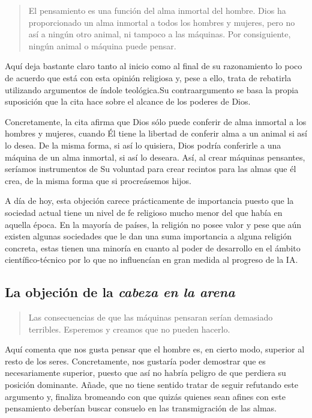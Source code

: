 \documentclass[12pt,a4paper]{article}
\begin{document}
\begin{quote}\small El pensamiento es una función del alma inmortal del hombre. Dios ha proporcionado un alma inmortal a todos los hombres y mujeres, pero no así a ningún otro animal, ni tampoco a las máquinas. Por consiguiente, ningún animal o máquina puede pensar.\end{quote}

Aquí deja bastante claro tanto al inicio como al final de su razonamiento lo poco de acuerdo que está con esta opinión religiosa y, pese a ello, trata de rebatirla utilizando argumentos de índole teológica.Su contraargumento se basa la propia suposición que la cita hace sobre el alcance de los poderes de Dios.

Concretamente, la cita afirma que Dios sólo puede conferir de alma inmortal a los hombres y mujeres, cuando Él tiene la libertad de conferir alma a un animal si así lo desea. De la misma forma, si así lo quisiera, Dios podría conferirle a una máquina de un alma inmortal, si así lo deseara. Así, al crear máquinas pensantes, seríamos instrumentos de Su voluntad para crear recintos para las almas que él crea, de la misma forma que si procreásemos hijos.

A día de hoy, esta objeción carece prácticamente de importancia puesto que la sociedad actual tiene un nivel de fe religioso mucho menor del que había en aquella época. En la mayoría de países, la religión no posee valor y pese que aún existen algunas sociedades que le dan una suma importancia a alguna religión concreta, estas tienen una minoría en cuanto al poder de desarrollo en el ámbito científico-técnico por lo que no influencían en gran medida al progreso de la IA.

\subsection{La objeción de la \emph{cabeza en la arena}}
\begin{quote}\small Las consecuencias de que las máquinas pensaran serían demasiado terribles. Esperemos y creamos que no pueden hacerlo.\end{quote}

Aquí comenta que nos gusta pensar que el hombre es, en cierto modo, superior al resto de los seres. Concretamente, nos gustaría poder demostrar que es necesariamente superior, puesto que así no habría peligro de que perdiera su posición dominante. Añade, que no tiene sentido tratar de seguir refutando este argumento y, finaliza bromeando con que quizás quienes sean afines con este pensamiento deberían buscar consuelo en las transmigración de las almas.
\end{document}

